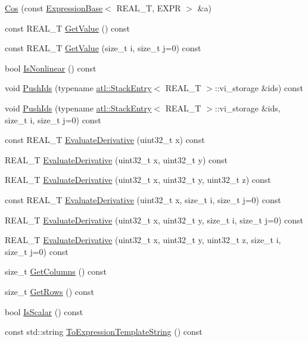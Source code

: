 \begin{DoxyCompactItemize}
\item 
\hyperlink{structatl_1_1_cos_ae15e8fe45ce07f796b8e6b0f3c81a0dc}{Cos} (const \hyperlink{structatl_1_1_expression_base}{Expression\+Base}$<$ R\+E\+A\+L\+\_\+\+T, E\+X\+P\+R $>$ \&a)
\item 
const R\+E\+A\+L\+\_\+\+T \hyperlink{structatl_1_1_cos_ace4e1b39754eac681d88a8e51777fe03}{Get\+Value} () const 
\item 
const R\+E\+A\+L\+\_\+\+T \hyperlink{structatl_1_1_cos_a81e3e2ea49369fe0ce486cb49501211b}{Get\+Value} (size\+\_\+t i, size\+\_\+t j=0) const 
\item 
bool \hyperlink{structatl_1_1_cos_a6e00e3cfb0c28889388320143ed5892f}{Is\+Nonlinear} () const 
\item 
void \hyperlink{structatl_1_1_cos_af1f885b1e8af4a022c3a81d901e0705c}{Push\+Ids} (typename \hyperlink{structatl_1_1_stack_entry}{atl\+::\+Stack\+Entry}$<$ R\+E\+A\+L\+\_\+\+T $>$\+::vi\+\_\+storage \&ids) const 
\item 
void \hyperlink{structatl_1_1_cos_a52e381c8bab1a3e8dd59dda17f39b34b}{Push\+Ids} (typename \hyperlink{structatl_1_1_stack_entry}{atl\+::\+Stack\+Entry}$<$ R\+E\+A\+L\+\_\+\+T $>$\+::vi\+\_\+storage \&ids, size\+\_\+t i, size\+\_\+t j=0) const 
\item 
const R\+E\+A\+L\+\_\+\+T \hyperlink{structatl_1_1_cos_a0767cd6f515ac25ade8c54cacc0cd309}{Evaluate\+Derivative} (uint32\+\_\+t x) const 
\item 
R\+E\+A\+L\+\_\+\+T \hyperlink{structatl_1_1_cos_a861f527ace28cad61c0bd85665cd113a}{Evaluate\+Derivative} (uint32\+\_\+t x, uint32\+\_\+t y) const 
\item 
R\+E\+A\+L\+\_\+\+T \hyperlink{structatl_1_1_cos_a3daf2ee3406609a53b3d875fdf1d7a61}{Evaluate\+Derivative} (uint32\+\_\+t x, uint32\+\_\+t y, uint32\+\_\+t z) const 
\item 
const R\+E\+A\+L\+\_\+\+T \hyperlink{structatl_1_1_cos_a3aa481f075e1185ebb213487e164a2b0}{Evaluate\+Derivative} (uint32\+\_\+t x, size\+\_\+t i, size\+\_\+t j=0) const 
\item 
R\+E\+A\+L\+\_\+\+T \hyperlink{structatl_1_1_cos_a266a79077d99d1f824c23d538ca23266}{Evaluate\+Derivative} (uint32\+\_\+t x, uint32\+\_\+t y, size\+\_\+t i, size\+\_\+t j=0) const 
\item 
R\+E\+A\+L\+\_\+\+T \hyperlink{structatl_1_1_cos_a77ec0b54497a31b2a35901ca23181641}{Evaluate\+Derivative} (uint32\+\_\+t x, uint32\+\_\+t y, uint32\+\_\+t z, size\+\_\+t i, size\+\_\+t j=0) const 
\item 
size\+\_\+t \hyperlink{structatl_1_1_cos_af5a069ad08213ab339be8fa79b634e8f}{Get\+Columns} () const 
\item 
size\+\_\+t \hyperlink{structatl_1_1_cos_ae2817379b49f18cbf607e1a582466878}{Get\+Rows} () const 
\item 
bool \hyperlink{structatl_1_1_cos_a20a3fc284b6785049cf2b2497f9b3b74}{Is\+Scalar} () const 
\item 
const std\+::string \hyperlink{structatl_1_1_cos_af0c72d72a080a335e1d272db4fa519b5}{To\+Expression\+Template\+String} () const 
\end{DoxyCompactItemize}
